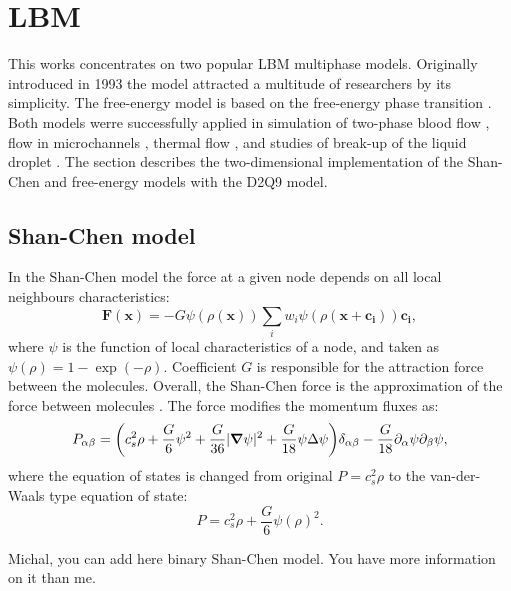 \documentclass[mathpazo,sort,numbers]{cicp}
\begin{document}
\section{LBM}
\label{sec:lbm:binary:liquids}
This works concentrates on two popular LBM multiphase models. Originally introduced in 1993 \cite{Shan-chen:extended} the model attracted a multitude of researchers by its simplicity.  The free-energy model \cite{swift} is based on the free-energy phase transition \cite{landau}. Both models werre successfully applied in simulation of two-phase blood flow \cite{halliday-multicomponent}, flow in microchannels \cite{pooley-contact}, thermal flow \cite{zhang-thermal}, and studies of break-up of the liquid droplet \cite{nourgaliev-breakup}. The section describes the two-dimensional implementation of the Shan-Chen and free-energy models with the D2Q9 model.

\subsection{Shan-Chen model}
In the Shan-Chen model \cite{Shan-chen:extended} the force at a given node depends on all local neighbours characteristics:
\begin{equation}  \label{Shan-Chen:Shan-Chen:cont}
\bm{F}(\bm{x})=-G\psi(\rho(\bm{x}))\sum_{i}{w_i \psi(\rho(\bm{x}+\bm{c_i}))\bm{c_{i}}},
\end{equation}
where $\psi$ is the function of local characteristics of a node, and taken as $\psi(\rho)=1-\exp(-\rho)$. Coefficient $G$ is responsible for the attraction force between the molecules. Overall, the Shan-Chen force is the approximation of the force between molecules \cite{kwok,kwok-contact-angle}. The force modifies the momentum fluxes as:
\begin{equation*}
P_{\alpha\beta}=\biggl(c_s^2\rho+\frac{G}{6}\psi^2+\frac{G}{36}%
|\bm{\nabla}\psi|^2 +\frac{G}{18}\psi\Delta\psi\biggr)\delta_{\alpha\beta}-\frac{G}{%
18}\partial_{\alpha}\psi\partial_{\beta}\psi,
\end{equation*}
where the equation of states is changed from original $P=c_s^2 \rho$ \cite{Succi-book} to the van-der-Waals type equation of state:
\begin{equation} 
P=c_s^2 \rho +\frac{G}{6} \psi(\rho)^2.
\end{equation}

{\color{red} Michal, you can add here binary Shan-Chen model. You have more information on it than me.}
\end{document}
